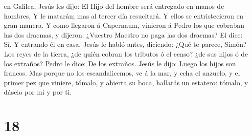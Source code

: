 en Galilea, Jesús les dijo: El Hijo del hombre será entregado en manos
de hombres,  Y le matarán; mas al tercer día resucitará. Y
ellos se entristecieron en gran manera.  Y como llegaron á
Capernaum, vinieron á Pedro los que cobraban las dos dracmas, y dijeron:
¿Vuestro Maestro no paga las dos dracmas?  El dice: Sí. Y
entrando él en casa, Jesús le habló antes, diciendo: ¿Qué te parece,
Simón? Los reyes de la tierra, ¿de quién cobran los tributos ó el censo?
¿de sus hijos ó de los extraños?  Pedro le dice: De los
extraños. Jesús le dijo: Luego los hijos son francos.  Mas
porque no los escandalicemos, ve á la mar, y echa el anzuelo, y el
primer pez que viniere, tómalo, y abierta su boca, hallarás un estatero:
tómalo, y dáselo por mí y por ti.

\hypertarget{section-17}{%
\section{18}\label{section-17}}


